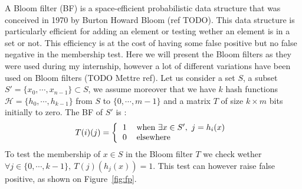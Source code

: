A Bloom filter (BF) is a space-efficient probabilistic data structure that was conceived in 1970 by Burton Howard Bloom (ref TODO). This data structure is particularly efficient for adding an element or testing wether an element is in a set or not. This efficiency is at the cost of having some false positive but no false negative in the membership test. Here we will present the Bloom filters as they were used during my internship, however a lot of different variations have been used on Bloom filters (TODO Mettre ref). Let us consider a set $S$, a subset $S' = \{x_0,\cdots,x_{n-1}\} \subset S$, we assume moreover that we have $k$ hash functions $\mathcal{H}=\{h_0,\cdots,h_{k-1}\}$ from $S$ to $\{0,\cdots,m-1\}$ and a matrix $T$ of size $k \times m$ bits initially to zero. The BF of $S'$ is :
\begin{equation*}
T(i)(j) = \left \{ 
\begin{tabular}{c l} 
$1$ & when $\exists x \in S',\ j = h_i(x)$ \\
0 & elsewhere
\end{tabular}
\right .
\end{equation*}
To test the membership of $x\in S$ in the Bloom filter $T$ we check wether $\forall j \in \{0,\cdots,k-1\},\ T(j)(h_j(x)) = 1$. This test can however raise 
false positive, as shown on Figure~\ref{fig:fp}.
